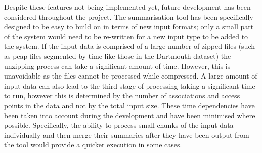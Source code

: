 Despite these features not being implemented yet, future development has been considered throughout the project. The summarisation tool has been specifically designed to be easy to build on in terms of new input formats; only a small part of the system would need to be re-written for a new input type to be added to the system.
If the input data is comprised of a large number of zipped files (such as pcap files segmented by time like those in the Dartmouth dataset) the unzipping process can take a significant amount of time. However, this is unavoidable as the files cannot be processed while compressed. A large amount of input data can also lead to the third stage of processing taking a significant time to run, however this is determined by the number of associations and access points in the data and not by the total input size. These time dependencies have been taken into account during the development and have been minimised where possible. Specifically, the ability to process small chunks of the input data individually and then merge their summaries after they have been output from the tool would provide a quicker execution in some cases.\\\\